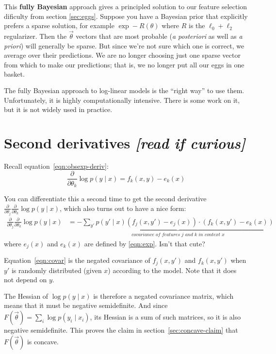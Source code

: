 \documentclass[11pt]{article}
\newcommand{\vtheta}{\vec{\theta}}
\newcommand{\diffk}{\frac{\partial}{\partial \theta_k}}
\newcommand{\diffj}{\frac{\partial}{\partial \theta_j}}
\begin{document}
This {\bf fully Bayesian} approach gives a principled solution to our feature selection dificulty from section \ref{sec:eggs}.  Suppose you have a Bayesian prior that explicitly prefers a sparse solution, for example $\exp -R(\theta)$ where $R$ is the $\ell_0+\ell_2$ regularizer.  Then the $\vtheta$ vectors that are most probable ({\em a posteriori} as well as {\em a priori}) will generally be sparse.  But since we're not sure which one is correct, we average over their predictions.  We are no longer choosing just one sparse vector from which to make our predictions; that is, we no longer put all our eggs in one basket.

The fully Bayesian approach to log-linear models is the ``right way''
to use them.  Unfortunately, it is highly computationally intensive.
There is some work on it, but it is not widely used in practice.

\section{Second derivatives  {\em [read if curious]}}\label{app:hessian}

Recall equation~\eqref{eqn:obsexp-deriv}:
$$\diffk \log p(y \mid x) = f_k(x,y) - e_k(x)$$

You can differentiate this a second time to get the second derivative $\diffj
\diffk \log p(y \mid x)$, which also turns out to have a nice form:
\begin{align}
  \diffj \diffk \log p(y \mid x) &= -\underbrace{\sum_{y'} p(y' \mid x) \left( f_j(x,y') - e_j(x) \right)
                                   \cdot \left( f_k(x,y') - e_k(x)
                                   \right)}_{\textit{covariance of
                                   features $j$ and $k$ in context
                                   $x$}} \label{eqn:covar}
\end{align}
where $e_j(x)$ and $e_k(x)$ are defined by \eqref{eqn:exp}.  Isn't that cute?

Equation~\eqref{eqn:covar} is the negated covariance of $f_j(x,y')$
and $f_k(x,y')$ when $y'$ is randomly distributed (given $x$)
according to the model.  Note that it does not depend on $y$.

The Hessian of $\log p(y \mid x)$ is therefore a negated covariance
matrix, which means that it must be negative semidefinite.  And since
$F(\vtheta) = \sum_i \log p(y_i \mid x_i)$, its Hessian is a sum of
such matrices, so it is also negative semidefinite.  This proves the
claim in section~\ref{sec:concave-claim} that $F(\vec{\theta})$ is
concave.
\end{document}

